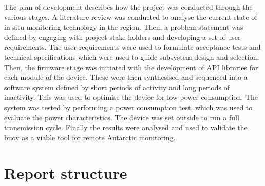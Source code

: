 The plan of development describes how the project was conducted through the various stages. A literature review was conducted to analyse the current state of in situ monitoring technology in the region. Then, a problem statement was defined by engaging with project stake holders and developing a set of user requirements. The user requirements were used to formulate acceptance tests and technical specifications which were used to guide subsystem design and selection. Then, the firmware stage was initiated with the development of API libraries for each module of the device. These were then synthesised and sequenced into a software system defined by short periods of activity and long periods of inactivity. This was used to optimise the device for low power consumption. The system was tested by performing a power consumption test, which was used to evaluate the power characteristics. The device was set outside to run a full transmission cycle. Finally the results were analysed and used to validate the buoy as a viable tool for remote Antarctic monitoring.
\pagebreak
\section{Report structure}

